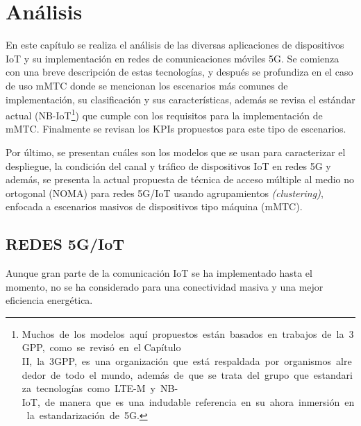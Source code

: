 \chapter{Análisis} %
\label{Chapter4} %

En este capítulo se realiza el análisis de las diversas aplicaciones de dispositivos IoT y su implementación en redes de comunicaciones móviles 5G. Se comienza con una breve descripción de estas tecnologías, y después se profundiza en el caso de uso mMTC donde se mencionan los escenarios más comunes de implementación, su clasificación y sus características, además se revisa el estándar actual (NB-IoT\footnote{ Muchos\ de\ los\ modelos\ aqu\textrm{í}\ propuestos\ est\textrm{á}n\ basados\ en\ trabajos\ de\ la\ 3GPP,\ como\ se\ revis\textrm{ó}\ en\ el Capítulo II,\ la\ 3GPP,\ es\ una\ organizaci\textrm{ó}n\ que\ est\textrm{á}\ respaldada\ por\ organismos\ alrededor\ de\ todo\ el\ mundo,\ adem\textrm{á}s\ de\ que\ se\ trata\ del\ grupo\ que\ estandariza\ tecnolog\textrm{í}as\ como\ LTE-M\ y\ NB-IoT,\ de\ manera\ que\ es\ una\ indudable\ referencia\ en\ su\ ahora\ inmersi\textrm{ó}n\ en\ la\ estandarizaci\textrm{ó}n\ de\ 5G.}) que cumple con los requisitos para la implementación de mMTC. Finalmente se revisan los KPIs propuestos para este tipo de escenarios.\newline

Por último, se presentan cuáles son los modelos que se usan para caracterizar el despliegue, la condición del canal y tráfico de dispositivos IoT en redes 5G y además, se presenta la actual propuesta de técnica de acceso múltiple al medio no ortogonal (NOMA) para redes 5G/IoT usando agrupamientos \textit{(clustering)}, enfocada a escenarios masivos de dispositivos tipo máquina (mMTC).


\section{REDES 5G/IoT}

Aunque gran parte de la comunicación IoT se ha implementado hasta el momento, no se ha considerado para una conectividad masiva y una mejor eficiencia energética. \newline

